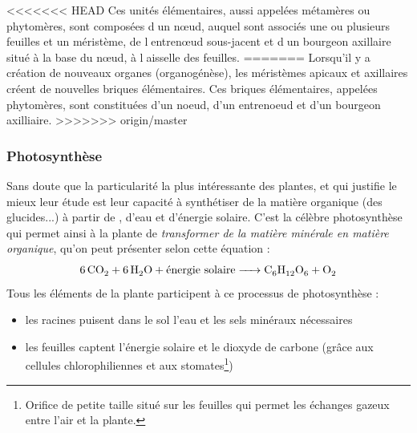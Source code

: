 <<<<<<< HEAD
 Ces unités élémentaires, aussi appelées métamères ou phytomères, sont composées dun nœud, auquel sont associés une ou plusieurs feuilles et un méristème, de lentrenœud sous-jacent et dun bourgeon axillaire situé à la base du nœud, à laisselle des feuilles.
=======
Lorsqu'il y a création de nouveaux organes (organogénèse), les méristèmes apicaux et axillaires créent de nouvelles briques élémentaires. 
Ces briques élémentaires, appelées phytomères, sont constituées d'un noeud, d'un entrenoeud et d'un bourgeon axilliaire.
>>>>>>> origin/master


\subsubsection{Photosynthèse}


Sans doute que la particularité la plus intéressante des plantes, et qui justifie le mieux leur étude est leur capacité à synthétiser de la matière organique (des glucides...) à partir de , d'eau et d'énergie solaire. C'est la célèbre photosynthèse qui permet ainsi à la plante de \textit{transformer de la matière minérale en matière organique}, qu'on peut présenter selon cette équation : 
\[
	\ce{6CO2 + 6H2O + \text{énergie solaire} -> C6H12O6 + O2 }
\]
Tous les éléments de la plante participent à ce processus de photosynthèse :
\begin{itemize}
	\item les racines puisent dans le sol l'eau et les sels minéraux nécessaires		
	\item les feuilles captent l'énergie solaire et le dioxyde de carbone 
  (grâce aux cellules chlorophiliennes 
  et aux stomates\footnote{Orifice de petite taille situé sur les feuilles 
  qui permet les échanges gazeux entre l'air et la plante.})
\end{itemize}

